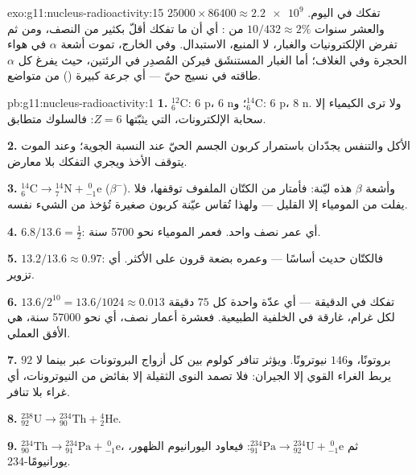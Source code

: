 \begin{solution}{exo:g11:nucleus-radioactivity:15}
$\num{25000} \times 86400 \approx \num{2.2e9}$ تفكك في اليوم. والعشر سنوات
$10/432 \approx 2\%$ من : أي أن ما تفكك أقلّ بكثير من النصف، ومن ثم
تفرض الإلكترونيات والغبار، لا المنبع، الاستبدال. وفي الخارج، تموت أشعة
$\alpha$ في هواء الحجرة وفي الغلاف؛ أما الغبار المستنشَق فيركن
المُصدِر في الرئتين، حيث يفرغ كل $\alpha$ طاقته في نسيج
حيّ --- أي جرعة كبيرة () من  متواضع.
\end{solution}

\begin{solution}{pb:g11:nucleus-radioactivity:1}
\textbf{1.} ${}^{12}_{6}\mathrm{C}$: $6$ p، $6$ n؛ و${}^{14}_{6}\mathrm{C}$:
$6$ p، $8$ n. ولا ترى الكيمياء إلا سحابة الإلكترونات، التي يثبّتها $Z = 6$:
فالسلوك متطابق.

\textbf{2.} الأكل والتنفس يجدّدان باستمرار كربون الجسم الحيّ
عند النسبة الجوية؛ وعند الموت يتوقف الأخذ ويجري التفكك
بلا معارض.

\textbf{3.} ${}^{14}_{6}\mathrm{C} \to {}^{14}_{7}\mathrm{N} +
{}^{\;0}_{-1}\mathrm{e}$ ($\beta^-$). وأشعة $\beta$ هذه ليّنة:
فأمتار من الكتّان الملفوف توقفها، فلا يفلت من المومياء إلا القليل --- ولهذا
تُقاس عيّنة كربون صغيرة تُؤخذ من الشيء نفسه.

\textbf{4.} $6.8/13.6 = \frac12$: أي عمر نصف واحد. فعمر المومياء نحو
\num{5700} سنة.

\textbf{5.} $13.2/13.6 \approx 0.97$: فالكتّان حديث أساسًا ---
وعمره بضعة قرون على الأكثر. أي تزوير.

\textbf{6.} $13.6/2^{10} = 13.6/1024 \approx 0.013$ تفكك في الدقيقة ---
أي عدّة واحدة كل $75$ دقيقة لكل غرام، غارقة في الخلفية الطبيعية. فعشرة
أعمار نصف، أي نحو \num{57000} سنة، هي الأفق العملي.

\textbf{7.} $92$ بروتونًا، و$146$ نيوترونًا. ويؤثر تنافر كولوم بين
كل أزواج البروتونات عبر  بينما لا يربط الغراء القوي إلا
الجيران: فلا تصمد النوى الثقيلة إلا بفائض من النيوترونات، أي غراء بلا
تنافر.

\textbf{8.} ${}^{238}_{92}\mathrm{U} \to {}^{234}_{90}\mathrm{Th} +
{}^{4}_{2}\mathrm{He}$.

\textbf{9.} ${}^{234}_{90}\mathrm{Th} \to {}^{234}_{91}\mathrm{Pa} +
{}^{\;0}_{-1}\mathrm{e}$، ثم ${}^{234}_{91}\mathrm{Pa} \to
{}^{234}_{92}\mathrm{U} + {}^{\;0}_{-1}\mathrm{e}$: فيعاود اليورانيوم الظهور،
يورانيومًا-234.


\end{solution}
